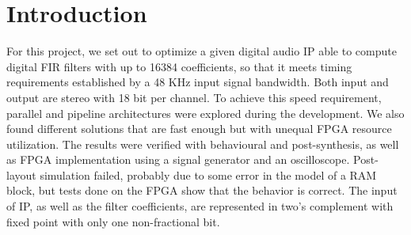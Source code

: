 \documentclass[12pt]{article}
\begin{document}
{
	
	\pagestyle{empty}
	\titleAT
	\newpage
}
\setcounter{page}{1}

\section{Introduction}

For this project, we set out to optimize a given digital audio IP able to compute digital FIR
filters with up to 16384 coefficients, so that it meets timing requirements established by a 48 KHz
input signal bandwidth. Both input and output are stereo with 18 bit per channel. To achieve this
speed requirement, parallel and pipeline architectures were explored during the development. We also
found different solutions that are fast enough but with unequal FPGA resource utilization. The
results were verified with behavioural and post-synthesis, as well as FPGA implementation using a
signal generator and an oscilloscope. Post-layout simulation failed, probably due to some error in
the model of a RAM block, but tests done on the FPGA show that the behavior is correct.
The input of IP, as well as the filter coefficients, are represented in two's complement with fixed
point with only one non-fractional bit. 
\end{document}
